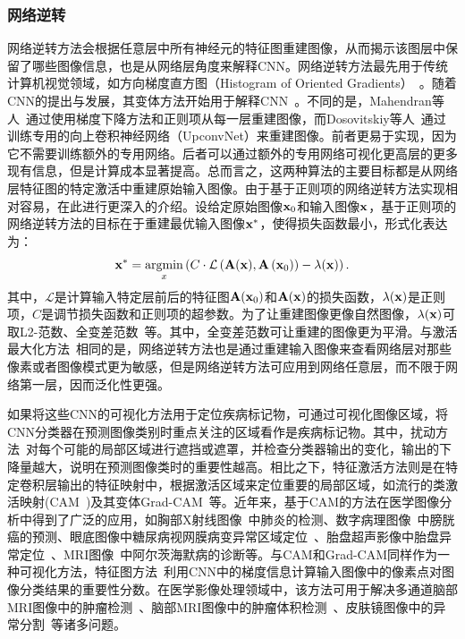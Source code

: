 \subsubsection*{网络逆转}
网络逆转方法会根据任意层中所有神经元的特征图重建图像，从而揭示该图层中保留了哪些图像信息，也是从网络层角度来解释CNN。网络逆转方法最先用于传统计算机视觉领域，如方向梯度直方图（Histogram of Oriented Gradients）~\cite{dalal2005histograms}。随着CNN的提出与发展，其变体方法开始用于解释CNN~\cite{mahendran2015understanding, mahendran2016visualizing, dosovitskiy2016inverting}。不同的是，Mahendran等人~\cite{mahendran2015understanding, mahendran2016visualizing}通过使用梯度下降方法和正则项从每一层重建图像，而Dosovitskiy等人~\cite{dosovitskiy2016inverting}通过训练专用的向上卷积神经网络（UpconvNet）来重建图像。前者更易于实现，因为它不需要训练额外的专用网络。后者可以通过额外的专用网络可视化更高层的更多现有信息，但是计算成本显著提高。总而言之，这两种算法的主要目标都是从网络层特征图的特定激活中重建原始输入图像。由于基于正则项的网络逆转方法实现相对容易，在此进行更深入的介绍。设给定原始图像$\mathbf{x}_0$和输入图像$\mathbf{x}$，基于正则项的网络逆转方法的目标在于重建最优输入图像$\mathbf{x}^*$，使得损失函数最小，形式化表达为：
\begin{equation}
\mathbf{x}^{*}=\underset{x}{\operatorname{argmin}}\left(C \cdot \mathcal{L}\left(\mathbf{A}(\mathbf{x}), \mathbf{A}\left(\mathbf{x}_{0}\right)\right)-\lambda(\mathbf{x})\right).
\end{equation}
其中，$\mathcal{L}$是计算输入特定层前后的特征图$\mathbf{A}(\mathbf{x}_0)$和$\mathbf{A}(\mathbf{x})$的损失函数，$\lambda(\mathbf{x})$是正则项，$C$是调节损失函数和正则项的超参数。为了让重建图像更像自然图像，$\lambda(\mathbf{x})$可取L2-范数、全变差范数~\cite{rudin1992nonlinear}等。其中，全变差范数可让重建的图像更为平滑。与激活最大化方法~\cite{simonyan2013deep}相同的是，网络逆转方法也是通过重建输入图像来查看网络层对那些像素或者图像模式更为敏感，但是网络逆转方法可应用到网络任意层，而不限于网络第一层，因而泛化性更强。

如果将这些CNN的可视化方法用于定位疾病标记物，可通过可视化图像区域，将CNN分类器在预测图像类别时重点关注的区域看作是疾病标记物。其中，扰动方法~\cite{zintgraf2017visualizing}对每个可能的局部区域进行遮挡或遮罩，并检查分类器输出的变化，输出的下降量越大，说明在预测图像类时的重要性越高。相比之下，特征激活方法则是在特定卷积层输出的特征映射中，根据激活区域来定位重要的局部区域，如流行的类激活映射(CAM~\cite{zhou2016learning})及其变体Grad-CAM~\cite{selvaraju2017grad}等。近年来，基于CAM的方法在医学图像分析中得到了广泛的应用，如胸部X射线图像~\cite{rajpurkar2017chexnet}中肺炎的检测、数字病理图像~\cite{zhang2017mdnet}中膀胱癌的预测、眼底图像中糖尿病视网膜病变异常区域定位~\cite{Gondaletal17}、胎盘超声影像中胎盘异常定位~\cite{Qi2017WeaklySL}、MRI图像~\cite{yang2018visual}中阿尔茨海默病的诊断等。与CAM和Grad-CAM同样作为一种可视化方法，特征图方法~\cite{simonyan2013deep}利用CNN中的梯度信息计算输入图像中的像素点对图像分类结果的重要性分数。在医学影像处理领域中，该方法可用于解决多通道脑部MRI图像中的肿瘤检测~\cite{banerjee2016novel}、脑部MRI图像中的肿瘤体积检测~\cite{mitra2017volumetric}、皮肤镜图像中的异常分割~\cite{jahanifar2018supervised}等诸多问题。

